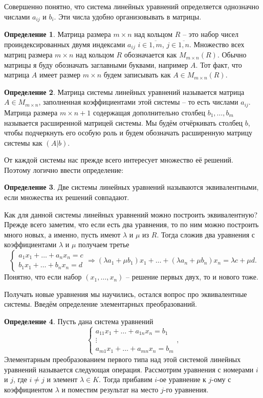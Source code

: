 \documentclass[10pt,a4paper,oneside]{book}
\theoremstyle{definition}
\newtheorem{defn}{Определение}
\newcommand{\ovl}{\overline}
\def\dfn{\begin{defn}}
\def\edfn{\end{defn}}
\begin{document}
 Совершенно понятно, что система линейных уравнений определяется однозначно числами $a_{ij}$ и $b_i$. Эти числа удобно организовывать в матрицы.

\dfn Матрица размера $m\times n$ над кольцом $R$ -- это набор чисел проиндексированных двумя индексами $a_{ij}$ $i\in \ovl{1,m}$, $j\in \ovl{1,n}$. Множество всех матриц размера $m\times n$ над кольцом $R$ обозначается как $M_{m\times n}(R)$. Обычно матрицы я буду обозначать заглавными буквами, например $A$. Тот факт, что матрица $A$ имеет размер $m\times n$ будем записывать как $A\in M_{m\times n}(R)$.
\edfn

\dfn Матрица системы линейных уравнений называется матрица $A\in M_{m\times n}$, заполненная коэффициентами этой системы -- то есть числами $a_{ij}$. Матрица размера $m\times n+1$ содержащая дополнительно столбец $b_1,\dots, b_m$ называется расширенной матрицей системы. Мы будём отчёркивать столбец $b$, чтобы подчеркнуть его особую роль и будем обозначать расширенную матрицу системы как $(A|b)$.
\edfn

От каждой системы нас прежде всего интересует множество её решений. Поэтому логично ввести определение:

\dfn Две системы линейных уравнений называются эквивалентными, если множества их решений совпадают.
\edfn

Как для данной системы линейных уравнений можно построить эквивалентную? Прежде всего заметим, что если есть два уравнения, то по ним можно построить много новых, а именно, пусть имеют $\lambda$ и $\mu$ из $R$. Тогда сложив два уравнения с коэффициентами $\lambda$ и $\mu$ получаем третье
$$\begin{cases}
a_1x_1+\dots+a_nx_n=c\\
b_1x_1+\dots+b_nx_n=d
\end{cases} \Rightarrow (\lambda a_1+\mu b_1)x_1+ \dots +(\lambda a_n+ \mu b_n)x_n= \lambda c+\mu d.$$
Понятно, что если набор $(x_1,\dots,x_n)$ -- решение первых двух, то и нового тоже.

Получать новые уравнения мы научились, остался вопрос про эквивалентные системы. Введём определение элементарных преобразований.

\dfn Пусть дана система уравнений
 $$\begin{cases}
a_{11}x_1+\dots + a_{1n}x_n=b_1\\
\vdots \\
a_{m1}x_1+\dots+a_{mn}x_n=b_m
\end{cases},$$
Элементарным преобразованием первого типа над этой системой линейных уравнений называется следующая операция. Рассмотрим уравнения с номерами $i$ и $j$, где $i\neq j$ и элемент $\lambda \in K$. Тогда прибавим  $i$-ое уравнение к $j$-ому с коэффициентом $\lambda$ и поместим результат на место $j$-го уравнения.
\edfn
\end{document}
